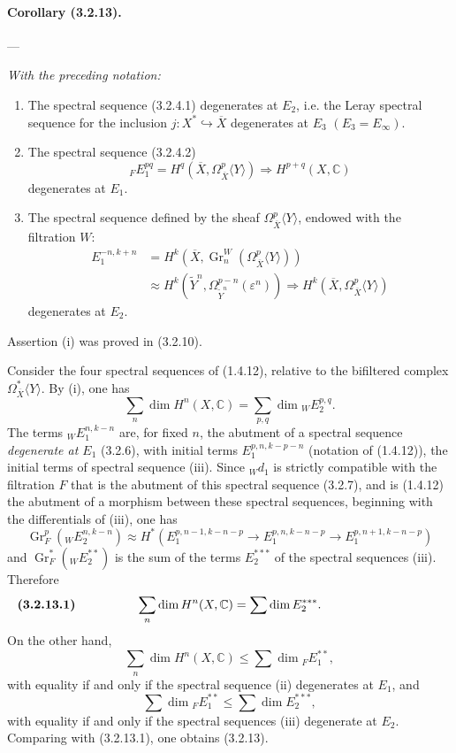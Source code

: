 \documentclass[10pt]{article}
\newcommand{\C}{\mathbb C}
\newcommand{\Gr}{\operatorname{Gr}}
\begin{document}
\paragraph{Corollary (3.2.13).} --- {\itshape With the preceding notation:
\begin{enumerate}[label=(\roman*)]
\item The spectral sequence (3.2.4.1) degenerates at $E_2$, i.e. the Leray spectral sequence for the inclusion $j:X^*\hookrightarrow\overline X$ degenerates at $E_3$ $(E_3=E_\infty)$.
\item The spectral sequence (3.2.4.2)
\[
{}_F E_1^{pq}=H^q(\overline X,\Omega_{\overline X}^p\langle Y\rangle)
\Longrightarrow H^{p+q}(X,\C)
\]
degenerates at $E_1$.
\item The spectral sequence defined by the sheaf $\Omega_{\overline X}^{p}\langle Y\rangle$, endowed with the filtration $W$:
\[
\begin{aligned}
E_1^{-n,k+n}
&=H^k(\overline X,\Gr_n^W(\Omega_{\overline X}^{p}\langle Y\rangle))\\
&\approx H^k(\widetilde Y^n,\Omega_{\widetilde Y^n}^{p-n}(\varepsilon^n))
\Longrightarrow H^k(\overline X,\Omega_{\overline X}^{p}\langle Y\rangle)
\end{aligned}
\]
degenerates at $E_2$.
\end{enumerate}}

Assertion (i) was proved in (3.2.10).

Consider the four spectral sequences of (1.4.12), relative to the bifiltered complex $\Omega_{\overline X}^{*}\langle Y\rangle$. By (i), one has
\[
\sum_n\dim H^n(X,\C)=\sum_{p,q}\dim {}_WE_2^{p,q}.
\]
The terms ${}_WE_1^{n,k-n}$ are, for fixed $n$, the abutment of a spectral sequence \emph{degenerate at $E_1$} (3.2.6), with initial terms $E_1^{p,n,k-p-n}$ (notation of (1.4.12)), the initial terms of spectral sequence (iii). Since ${}_Wd_1$ is strictly compatible with the filtration $F$ that is the abutment
of this spectral sequence (3.2.7), and is (1.4.12) the abutment of a morphism between these spectral sequences, beginning with the differentials of (iii), one has
\[
\Gr_F^p({}_WE_2^{n,k-n})\approx
H^*(E_1^{p,n-1,k-n-p}\to E_1^{p,n,k-n-p}\to E_1^{p,n+1,k-n-p})
\]
and $\Gr_F^*({}_WE_2^{**})$ is the sum of the terms $E_2^{***}$ of the spectral sequences (iii). Therefore
\[
\makebox[\textwidth][s]{\textbf{(3.2.13.1)}\hfill$\displaystyle \sum_n \dim H^n(X,\C)=\sum\dim E_2^{***}.$\hfill\phantom{\textbf{(3.2.13.1)}}}
\]
On the other hand,
\[
\sum_n \dim H^n(X,\C)\le \sum \dim {}_F E_1^{**},
\]
with equality if and only if the spectral sequence (ii) degenerates at $E_1$, and
\[
\sum\dim {}_F E_1^{**}\le \sum\dim E_2^{***},
\]
with equality if and only if the spectral sequences (iii) degenerate at $E_2$. Comparing with (3.2.13.1), one obtains (3.2.13).
\end{document}
